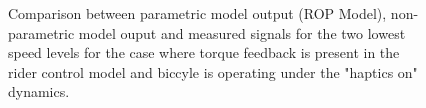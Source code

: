 \begin{figure}[!h]
    \centering
    \begin{subfigure}[b]{\textwidth}
        \centering
        \caption{}
        \label{fig:ropm_fit1}
    \end{subfigure}
    \begin{subfigure}[b]{\textwidth}
        \centering
        \caption{}
        \label{fig:ropm_fit2}
    \end{subfigure}
    
    \caption{Comparison between parametric model output (ROP Model), non-parametric model ouput and measured signals for the two lowest speed levels for the case where torque feedback is present in the rider control model and biccyle is operating under the "haptics on" dynamics.}
    \label{fig:ropm_fitA}
 \end{figure}

